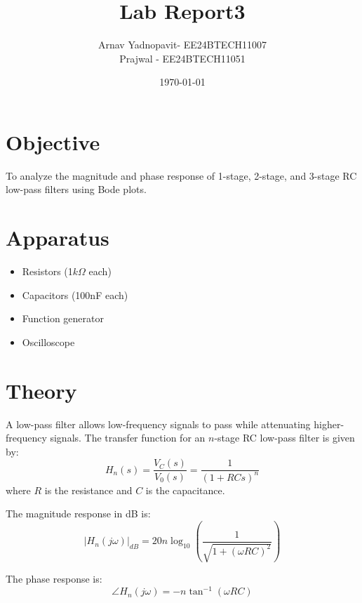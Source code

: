 \documentclass[a4paper,12pt]{article}
\title{Lab Report3}
\author{Arnav Yadnopavit- EE24BTECH11007\\Prajwal - EE24BTECH11051}
\date{\today}
\begin{document}
\maketitle
\section*{Objective}
To analyze the magnitude and phase response of 1-stage, 2-stage, and 3-stage RC low-pass filters using Bode plots.

\section*{Apparatus}
\begin{itemize}
    \item Resistors (1$k\Omega$ each)
    \item Capacitors (100nF each)
    \item Function generator
    \item Oscilloscope
\end{itemize}

\section*{Theory}
A low-pass filter allows low-frequency signals to pass while attenuating higher-frequency signals. The transfer function for an $n$-stage RC low-pass filter is given by:
\begin{equation}
H_n(s) =\frac{V_C(s)}{V_0(s)}= \frac{1}{(1 + RCs)^n}
\end{equation}
where $R$ is the resistance and $C$ is the capacitance.

The magnitude response in dB is:
\begin{equation}
|H_n(j\omega)|_{dB} = 20n \log_{10}\left(\frac{1}{\sqrt{1+(\omega RC)^2}}\right)
\end{equation}

The phase response is:
\begin{equation}
\angle H_n(j\omega) = -n \tan^{-1}(\omega RC)
\end{equation}
\begin{figure}[H]
    \centering
    \begin{subfigure}{0.5\textwidth}
        
    \end{subfigure}%
    \begin{subfigure}{0.5\textwidth}
        \centering
        
    \end{subfigure}
    \begin{subfigure}{0.5\textwidth}
        \centering
        
    \end{subfigure}
\end{figure}
\end{document}
